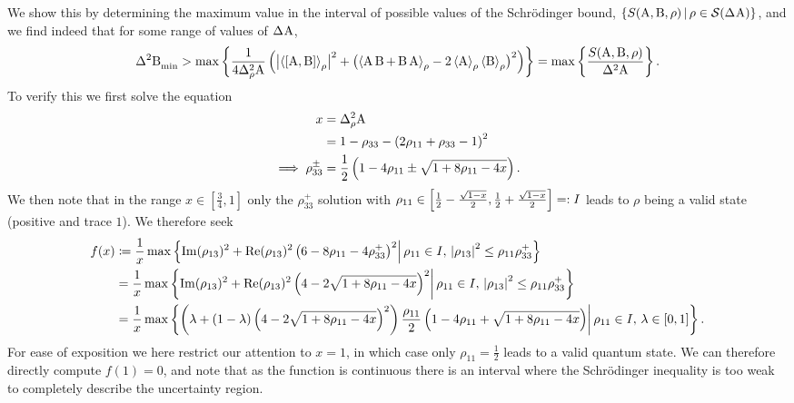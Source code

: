 We show this by determining the maximum value in the interval of possible values of the Schr\"odinger bound,
$\{S(\opa,\opb,\rho)\,|\, \rho\in\si(\sdev{\opa})\}$, and we find indeed that for some range of values of $\sdev{\opa}$,
\begin{equation}\label{eq:sch-uncertainty-region}%
  \varmin{\opb} > \max\left\{\frac{1}{4\varr{\opa}} \left(\bigl| \expr{\com{\opa}{\opb}} \bigr|^2
      + 
      \bigl(\expr{\acom{\opa}{\opb}}-2\expr{\opa}\expr{\opb}\bigr)^2\right)\right\}=\max\left\{\frac{S(\opa,\opb,\rho)}{\var{\opa}}\right\}.
\end{equation}
To verify this we first solve the equation
\begin{align}
  x &= \varr{\opa}\\
    &= 1 - \rho_{33} - \left(2\rho_{11} + \rho_{33} - 1\right)^2\\
  \implies \rho_{33}^\pm &= \frac{1}{2}\left(1 - 4\rho_{11} \pm\sqrt{1+8\rho_{11}-4x}\right).
\end{align}
We then note that in the range $x\in\left[\frac{3}{4} ,1\right]$ only the $\rho_{33}^+$ solution with $\rho_{11} \in \left[\frac{1}{2} - \frac{\sqrt{1-x}}{2},\frac{1}{2} + \frac{\sqrt{1-x}}{2}\right]=:I$ leads to $\rho$ being a valid state (positive and trace $1$). We therefore seek
\begin{align}
  f(x) &\coloneqq \frac{1}{x}\max\left\{\operatorname{Im}(\rho_{13})^2 +\operatorname{Re}(\rho_{13})^2\left(6-8\rho_{11}-4\rho_{33}^+\right)^2\middle|\, \rho_{11}\in I,\,\left\lvert\rho_{13}\right\rvert^2 \leq \rho_{11}\rho_{33}^+\right\}\\
       &= \frac{1}{x}\max\left\{\operatorname{Im}(\rho_{13})^2 +\operatorname{Re}(\rho_{13})^2\left(4-2\sqrt{1+8\rho_{11}-4x}\right)^2\middle|\, \rho_{11}\in I,\,\left\lvert\rho_{13}\right\rvert^2 \leq \rho_{11}\rho_{33}^+\right\}\\
       &= \frac{1}{x}\max\left\{\left(\lambda +(1-\lambda)\left(4-2\sqrt{1+8\rho_{11}-4x}\right)^2\right)\frac{\rho_{11}}{2}\left(1-4\rho_{11}+\sqrt{1+8\rho_{11}-4x}\right)\middle|\, \rho_{11}\in I,\,\lambda\in[0,1]\right\}.
\end{align}
For ease of exposition we here restrict our attention to $x = 1$, in which case only $\rho_{11} = \frac{1}{2}$ leads to a valid quantum state. We can therefore directly compute $f(1) = 0$, and note that as the function is continuous there is an interval where the Schr\"odinger inequality is too weak to completely describe the uncertainty region.  

